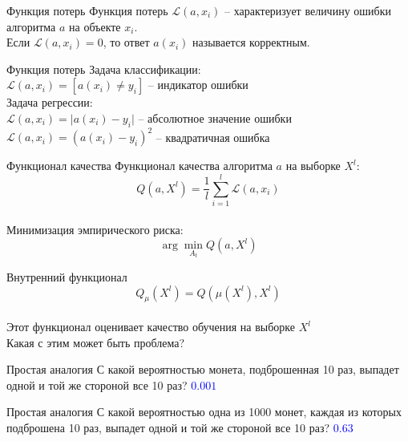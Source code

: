 \documentclass[10pt]{beamer}
\begin{document}
{
\begin{frame}{Функция потерь}
  Функция потерь $\mathcal{L}(a, x_i) $ -- характеризует величину ошибки алгоритма $a$ на объекте $x_i$.\\
  \bigbreak
  Если $\mathcal{L} (a, x_i) = 0$, то ответ $a(x_i)$ называется корректным.
\end{frame}
}

{
\begin{frame}{Функция потерь}
  Задача классификации:\\
  $\mathcal{L}(a, x_i) = [a(x_i) \neq y_i]$ -- индикатор ошибки\\
  \bigbreak
  Задача регрессии:\\
  $\mathcal{L}(a, x_i) = \vert a(x_i) - y_i \vert$ -- абсолютное значение ошибки\\
  $\mathcal{L}(a, x_i) = (a(x_i) - y_i)^2$ -- квадратичная ошибка\\
\end{frame}
}

{
\begin{frame}{Функционал качества}
  Функционал качества алгоритма $a$ на выборке $X^l$:\\
  $$Q(a, X^l) = \frac{1}{l} \sum\limits_{i=1}^l \mathcal{L}(a, x_i)$$\\
  Минимизация эмпирического риска:\\
  $$\arg\min\limits_{A_t} Q(a, X^l)$$
\end{frame}
}

\begin{frame}{Внутренний функционал}  
  $$Q_{\mu}(X^l) = Q(\mu(X^l), X^l)$$\\
  \bigbreak
  Этот функционал оценивает качество обучения на выборке $X^l$\\
  \bigbreak
  \pause
  Какая с этим может быть проблема?
\end{frame}

\begin{frame}{Простая аналогия}
  \centering
  С какой вероятностью монета, подброшенная 10 раз, выпадет одной и той же стороной все 10 раз?
  \pause
  \bigbreak
  \textcolor{blue}{$0.001$}
\end{frame}

\begin{frame}{Простая аналогия}
  \centering
  С какой вероятностью одна из 1000 монет, каждая из которых подброшена 10 раз, выпадет одной и той же стороной все 10 раз?
  \pause
  \bigbreak
  \textcolor{blue}{$0.63$}
\end{frame}
\end{document}
